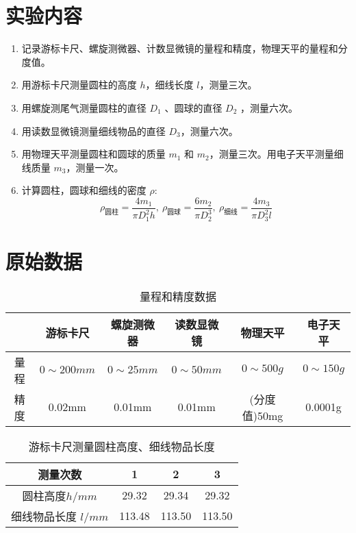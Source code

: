 \documentclass[UTF8]{ctexart}
\title{}
\author{}
\date{}
\begin{document}
\section{实验内容}
\begin{enumerate}
    \item 记录游标卡尺、螺旋测微器、计数显微镜的量程和精度，物理天平的量程和分度值。
    \item 用游标卡尺测量圆柱的高度 $h$，细线长度 $l$，测量三次。
    \item 用螺旋测尾气测量圆柱的直径 $D_1$ 、圆球的直径 $D_2$ ，测量六次。
    \item 用读数显微镜测量细线物品的直径 $D_3$，测量六次。
    \item 用物理天平测量圆柱和圆球的质量 $m_1$ 和 $m_2$，测量三次。用电子天平测量细线质量 $m_3$，测量一次。
    \item 计算圆柱，圆球和细线的密度 $\rho$:
    $$\rho_{\text{圆柱}} = \frac{4m_1}{\pi D_1^2 h},\  \rho_{\text{圆球}} = \frac{6m_2}{\pi D_2^3},\  \rho_{\text{细线}} = \frac{4m_3}{\pi D_3^2l}$$
\end{enumerate}

\section{原始数据}
\begin{table}[H]
\centering
\caption{量程和精度数据}
\begin{tabular}{|c|c|c|c|c|c|}
\hline
     & 游标卡尺 & 螺旋测微器 & 读数显微镜  & 物理天平  & 电子天平 \\
\hline
     量程 &  $0\sim 200mm$ & $0 \sim 25mm$ & $0 \sim 50mm$  & $0 \sim 500g$ & $0 \sim 150g$ \\
\hline 
    精度  & 0.02mm &  0.01mm & 0.01mm & (分度值)50mg  & 0.0001g\\
\hline
\end{tabular}
\end{table}

\begin{table}[H]
\centering
\caption{游标卡尺测量圆柱高度、细线物品长度}
\begin{tabular}{|c|c|c|c|}
\hline
     测量次数 & 1 & 2 & 3  \\
\hline
     圆柱高度$h/mm$ & 29.32 & 29.34 & 29.32 \\ 
\hline
     细线物品长度 $l/mm$ & 113.48 & 113.50 & 113.50\\ 
\hline
\end{tabular}
\end{table}
\end{document}
